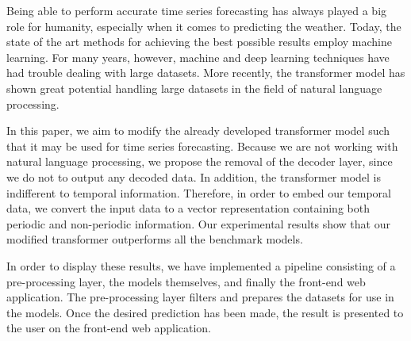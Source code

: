 Being able to perform accurate time series forecasting has always played a big role for humanity, especially when it comes to predicting the weather. 
Today, the state of the art methods for achieving the best possible results employ machine learning. 
For many years, however, machine and deep learning techniques have had trouble dealing with large datasets. 
More recently, the transformer model has shown great potential handling large datasets in the field of natural language processing.

In this paper, we aim to modify the already developed transformer model such that it may be used for time series forecasting. 
Because we are not working with natural language processing, we propose the removal of the decoder layer, since we do not to output any decoded data. 
In addition, the transformer model is indifferent to temporal information. 
Therefore, in order to embed our temporal data, we convert the input data to a vector representation containing both periodic and non-periodic information.
Our experimental results show that our modified transformer outperforms all the benchmark models.

In order to display these results, we have implemented a pipeline consisting of a pre-processing layer, the models themselves, and finally the front-end web application.
The pre-processing layer filters and prepares the datasets for use in the models.
Once the desired prediction has been made, the result is presented to the user on the front-end web application.